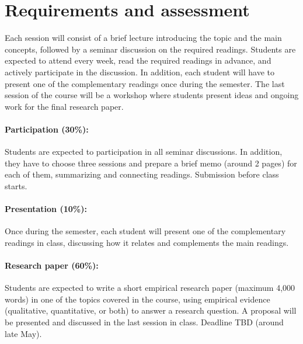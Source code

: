 \documentclass[12pt, a4paper]{article}
\begin{document}
\section{Requirements and assessment}

Each session will consist of a brief lecture introducing the topic and the main concepts, followed by a seminar discussion on the required readings. Students are expected to attend every week, read the required readings in advance, and actively participate in the discussion.
In addition, each student will have to present one of the complementary readings once during the semester.
The last session of the course will be a workshop where students present ideas and ongoing work for the final research paper.


\paragraph{Participation (30\%):} Students are expected to participation in all seminar discussions. In addition, they have to choose three sessions and prepare a brief memo (around 2 pages) for each of them, summarizing and connecting readings. Submission before class starts.

\vspace{-5pt}\paragraph{Presentation (10\%):} Once during the semester, each student will present one of the complementary readings in class, discussing how it relates and complements the main readings.

\vspace{-5pt}\paragraph{Research paper (60\%):} Students are expected to write a short empirical research paper (maximum 4,000 words) in one of the topics covered in the course, using empirical evidence (qualitative, quantitative, or both) to answer a research question. A proposal will be presented and discussed in the last session in class. Deadline TBD (around late May).
\end{document}

